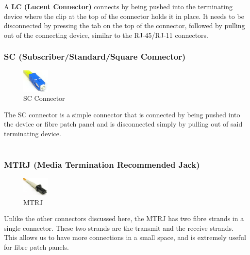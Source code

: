 A \textbf{LC (Lucent Connector)} connects by being pushed into the terminating device where the clip at the top of the connector holds it in place. It needs to be disconnected by pressing the tab on the top of the connector, followed by pulling out of the connecting device, similar to the RJ-45/RJ-11 connectors. 

\subsubsection{SC (Subscriber/Standard/Square Connector)}
\vspace{-10pt}
\begin{figure}
	\centering
	\vspace{-12pt}
	\includegraphics[width=0.12\textwidth]{"Mod1/chapters/1.4.m SC Connector"}
	\caption{\label{fig:sc_con}SC Connector}
	\vspace{-15pt}
\end{figure}

The SC connector is a simple connector that is connected by being pushed into the device or fibre patch panel and is disconnected simply by pulling out of said terminating device. \\ \\

\subsubsection{MTRJ (Media Termination Recommended Jack)}
\vspace{-10pt}
\begin{figure}
	\centering
	\vspace{-12pt}
	\includegraphics[width=0.12\textwidth]{"Mod1/chapters/1.4.n MTRJ"}
	\caption{\label{fig:mtrj_con}MTRJ}
	\vspace{-15pt}
\end{figure}

Unlike the other connectors discussed here, the MTRJ has two fibre strands in a single connector. These two strands are the transmit and the receive strands. This allows us to have more connections in a small space, and is extremely useful for fibre patch panels. 

